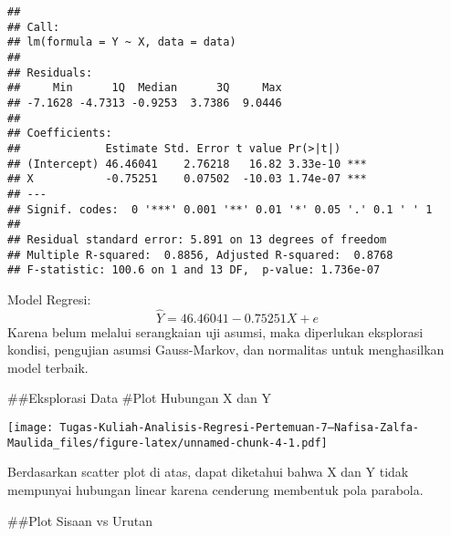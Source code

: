 \documentclass[
]{article}
\newenvironment{Shaded}{\begin{snugshade}}{\end{snugshade}}
\newcommand{\AttributeTok}[1]{\textcolor[rgb]{0.13,0.29,0.53}{#1}}
\newcommand{\DecValTok}[1]{\textcolor[rgb]{0.00,0.00,0.81}{#1}}
\newcommand{\FunctionTok}[1]{\textcolor[rgb]{0.13,0.29,0.53}{\textbf{#1}}}
\newcommand{\NormalTok}[1]{#1}
\newcommand{\SpecialCharTok}[1]{\textcolor[rgb]{0.81,0.36,0.00}{\textbf{#1}}}
\newcommand{\StringTok}[1]{\textcolor[rgb]{0.31,0.60,0.02}{#1}}
\begin{document}
\begin{verbatim}
## 
## Call:
## lm(formula = Y ~ X, data = data)
## 
## Residuals:
##     Min      1Q  Median      3Q     Max 
## -7.1628 -4.7313 -0.9253  3.7386  9.0446 
## 
## Coefficients:
##             Estimate Std. Error t value Pr(>|t|)    
## (Intercept) 46.46041    2.76218   16.82 3.33e-10 ***
## X           -0.75251    0.07502  -10.03 1.74e-07 ***
## ---
## Signif. codes:  0 '***' 0.001 '**' 0.01 '*' 0.05 '.' 0.1 ' ' 1
## 
## Residual standard error: 5.891 on 13 degrees of freedom
## Multiple R-squared:  0.8856, Adjusted R-squared:  0.8768 
## F-statistic: 100.6 on 1 and 13 DF,  p-value: 1.736e-07
\end{verbatim}

Model Regresi: \[\hat Y = 46.46041 - 0.75251X +e\] Karena belum melalui
serangkaian uji asumsi, maka diperlukan eksplorasi kondisi, pengujian
asumsi Gauss-Markov, dan normalitas untuk menghasilkan model terbaik.

\#\#Eksplorasi Data \#Plot Hubungan X dan Y

\begin{Shaded}
\end{Shaded}

\texttt{[image: Tugas-Kuliah-Analisis-Regresi-Pertemuan-7---Nafisa-Zalfa-Maulida\_files/figure-latex/unnamed-chunk-4-1.pdf]}

Berdasarkan scatter plot di atas, dapat diketahui bahwa X dan Y tidak
mempunyai hubungan linear karena cenderung membentuk pola parabola.

\#\#Plot Sisaan vs Urutan

\begin{Shaded}
\end{Shaded}
\end{document}
